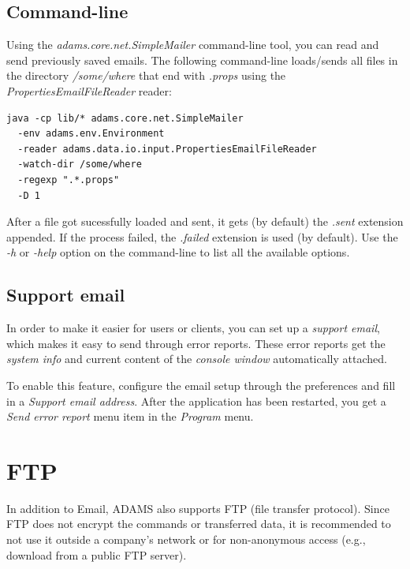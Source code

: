 \documentclass[a4paper]{book}
\begin{document}
\section{Command-line}
Using the \textit{adams.core.net.SimpleMailer} command-line tool, you can read
and send previously saved emails. The following command-line loads/sends all 
files in the directory \textit{/some/where} that end with \textit{.props} using the
\textit{PropertiesEmailFileReader} reader:
\begin{verbatim}
java -cp lib/* adams.core.net.SimpleMailer
  -env adams.env.Environment
  -reader adams.data.io.input.PropertiesEmailFileReader
  -watch-dir /some/where
  -regexp ".*.props"
  -D 1
\end{verbatim}
After a file got sucessfully loaded and sent, it gets (by default) the 
\textit{.sent} extension appended. If the process failed, the \textit{.failed}
extension is used (by default).
Use the \textit{-h} or \textit{-help} option on the command-line to list all 
the available options.

\section{Support email}
In order to make it easier for users or clients, you can set up a
\textit{support email}, which makes it easy to send through error reports.
These error reports get the \textit{system info} and current content
of the \textit{console window} automatically attached.

To enable this feature, configure the email setup through the preferences
and fill in a \textit{Support email address}. After the application has
been restarted, you get a \textit{Send error report} menu item in the
\textit{Program} menu.



\chapter{FTP}
In addition to Email, ADAMS also supports FTP (file transfer protocol). Since
FTP does not encrypt the commands or transferred data, it is recommended to not
use it outside a company's network or for non-anonymous access (e.g., download
from a public FTP server).
\end{document}
